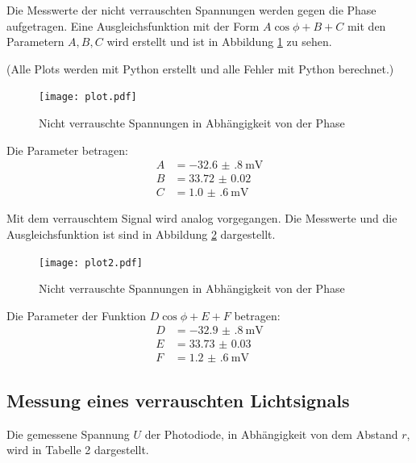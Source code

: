 Die Messwerte der nicht verrauschten Spannungen werden gegen die Phase aufgetragen. Eine Ausgleichsfunktion mit der Form
$A \cos{\phi + B} + C$ mit den Parametern $A, B ,C$ wird erstellt und ist in Abbildung \ref{fig:plot} zu sehen.

(Alle Plots werden mit Python erstellt und alle Fehler mit Python berechnet.)



\begin{figure}[H]
  \centering
  \texttt{[image: plot.pdf]}
  \caption{Nicht verrauschte Spannungen in Abhängigkeit von der Phase}
  \label{fig:plot}
\end{figure}

Die Parameter betragen:
\begin{align*}
  A &= \SI{-32.6(8)}{\milli\volt} \\
  B &= \SI{33.72(2)}{} \\
  C &= \SI{1.0(6)}{\milli\volt}
\end{align*}


Mit dem verrauschtem Signal wird analog vorgegangen. Die Messwerte und die Ausgleichsfunktion ist sind in Abbildung \ref{fig:plot2} dargestellt.

\begin{figure}[H]
  \centering
  \texttt{[image: plot2.pdf]}
  \caption{Nicht verrauschte Spannungen in Abhängigkeit von der Phase}
  \label{fig:plot2}
\end{figure}


Die Parameter der Funktion $D \cos{\phi + E} + F$ betragen:
\begin{align*}
  D &= \SI{-32.9(8)}{\milli\volt} \\
  E &= \SI{33.73(3)}{} \\
  F &= \SI{1.2(6)}{\milli\volt}
\end{align*}



\subsection{Messung eines verrauschten Lichtsignals}
Die gemessene Spannung $U$ der Photodiode, in Abhängigkeit von dem Abstand $r$, wird in Tabelle 2 dargestellt.

